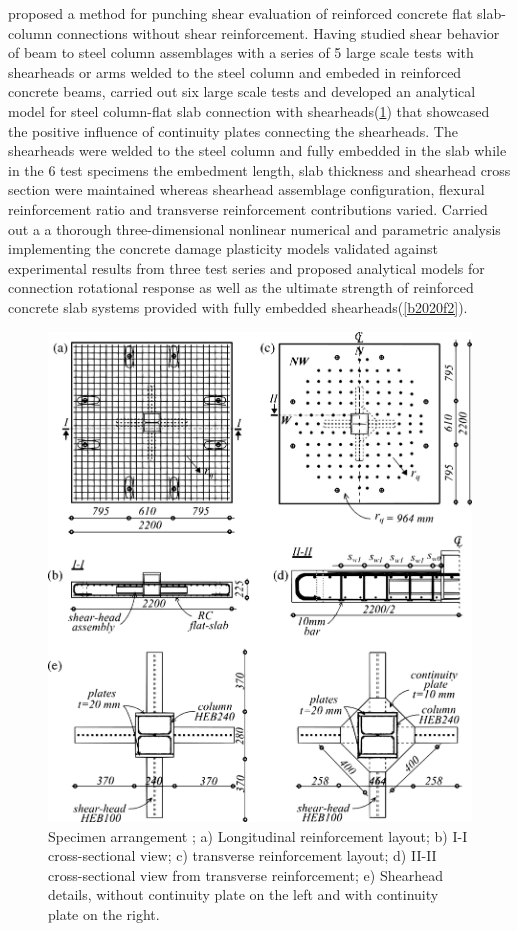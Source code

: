 \documentclass[twocolumn]{article} %
\begin{document}
\cite{bompa2015} proposed a method for punching shear evaluation of reinforced concrete flat slab-column connections without shear reinforcement. Having studied shear behavior of beam to steel column assemblages\citep{bompa2016b} with a series of 5 large scale tests with shearheads or arms welded to the steel column and embeded in reinforced concrete beams, \cite{Bompa2016a} carried out six large scale tests and developed an analytical model for steel column-flat slab connection with shearheads(\ref{bf2}) that showcased the positive influence of continuity plates connecting the shearheads. The shearheads were welded to the steel column and fully embedded in the slab while in the 6 test specimens the embedment length, slab thickness and shearhead cross section were maintained whereas shearhead assemblage configuration, flexural reinforcement ratio and transverse reinforcement contributions varied. \cite{bompa2020} Carried out a a thorough three-dimensional nonlinear numerical and parametric analysis implementing the concrete damage plasticity models validated against experimental results from three test series\citep{guandalini2009punching,chana1996,hawkins1974} and proposed analytical models for connection rotational response as well as the ultimate strength of reinforced concrete slab systems provided with fully embedded shearheads(\ref{b2020f2}). 
\begin{figure}\centering
    \includegraphics[width=\columnwidth]{Figures/bf2.pdf}
    \caption{Specimen arrangement \cite{Bompa2016a}; a) Longitudinal reinforcement layout; b) I-I cross-sectional view; c) transverse reinforcement layout; d) II-II cross-sectional view from transverse reinforcement; e) Shearhead details, without continuity plate on the left and with continuity plate on the right.}
    \label{bf2}
    \end{figure}
\end{document}

